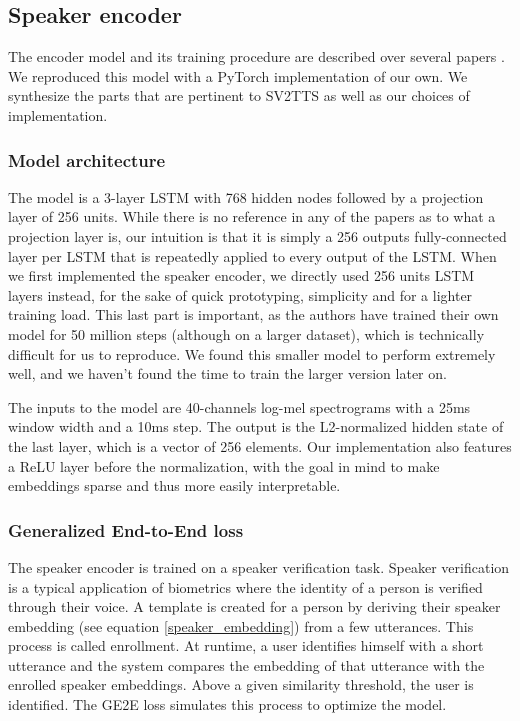 \documentclass[a4paper, oneside, 12pt, english]{article}
\begin{document}
\subsection{Speaker encoder} \label{speaker_encoder}
The encoder model and its training procedure are described over several papers \citep{SV2TTS, GE2E, TE2E}. We reproduced this model with a PyTorch implementation of our own. We synthesize the parts that are pertinent to SV2TTS as well as our choices of implementation.

\subsubsection{Model architecture}
The model is a 3-layer LSTM with 768 hidden nodes followed by a projection layer of 256 units. While there is no reference in any of the papers as to what a projection layer is, our intuition is that it is simply a 256 outputs fully-connected layer per LSTM that is repeatedly applied to every output of the LSTM. When we first implemented the speaker encoder, we directly used 256 units LSTM layers instead, for the sake of quick prototyping, simplicity and for a lighter training load. This last part is important, as the authors have trained their own model for 50 million steps (although on a larger dataset), which is technically difficult for us to reproduce. We found this smaller model to perform extremely well, and we haven't found the time to train the larger version later on.

The inputs to the model are 40-channels log-mel spectrograms with a 25ms window width and a 10ms step. The output is the L2-normalized hidden state of the last layer, which is a vector of 256 elements. Our implementation also features a ReLU layer before the normalization, with the goal in mind to make embeddings sparse and thus more easily interpretable.

\subsubsection{Generalized End-to-End loss}
The speaker encoder is trained on a speaker verification task. Speaker verification is a typical application of biometrics where the identity of a person is verified through their voice. A template is created for a person by deriving their speaker embedding (see equation \ref{speaker_embedding}) from a few utterances. This process is called enrollment. At runtime, a user identifies himself with a short utterance and the system compares the embedding of that utterance with the enrolled speaker embeddings. Above a given similarity threshold, the user is identified. The GE2E loss simulates this process to optimize the model. 
\end{document}
